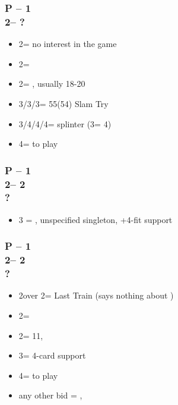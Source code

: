 \documentclass[12pt, a4paper]{article}
\begin{document}
\subsubsection*{P -- 1\spades \\ 2\clubs -- ?}
\begin{itemize}
    \item 2\spades = no interest in the game
    \item 2\diams = \inv
    \item 2\nt = \lsf, usually 18-20 \bal
    \item 3\clubs/3\diams/3\hearts = 55(54) Slam Try
    \item 3\nt/4\clubs/4\diams/4\hearts = splinter (3\nt = 4\hearts)
    \item 4\spades = to play
\end{itemize}

\subsubsection*{P -- 1\major \\ 2\clubs -- 2\major \\ ?}
\begin{itemize}
    \item 3 = \nat, unspecified singleton, +4-fit \major support
\end{itemize}

\subsubsection*{P -- 1\major \\ 2\clubs -- 2\diams \\ ?}
\begin{itemize}
    \item 2\hearts over 2\spades = Last Train (says nothing about \hearts)
    \item 2\major = \soff
    \item 2\nt = 11, \bal
    \item 3\major = 4-card support
    \item 4\major = to play
    \item any other bid = \nat, \inv
\end{itemize}

\end{document}
